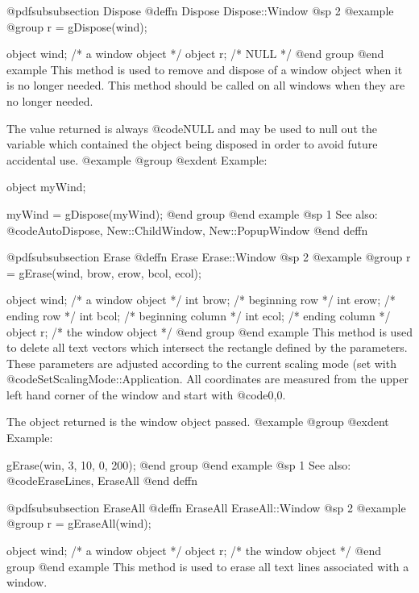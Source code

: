 @pdfsubsubsection {Dispose}
@deffn {Dispose} Dispose::Window
@sp 2
@example
@group
r = gDispose(wind);

object  wind;   /*  a window object    */
object  r;      /*  NULL               */
@end group
@end example
This method is used to remove and dispose of a window object when it
is no longer needed.  This method should be called on all windows
when they are no longer needed.

The value returned is always @code{NULL} and may be used to null out
the variable which contained the object being disposed in order to
avoid future accidental use.
@example
@group
@exdent Example:

object  myWind;

myWind = gDispose(myWind);
@end group
@end example
@sp 1
See also:  @code{AutoDispose, New::ChildWindow, New::PopupWindow}
@end deffn










@pdfsubsubsection {Erase}
@deffn {Erase} Erase::Window
@sp 2
@example
@group
r = gErase(wind, brow, erow, bcol, ecol);

object  wind;   /*  a window object     */
int     brow;   /*  beginning row       */
int     erow;   /*  ending row          */
int     bcol;   /*  beginning column    */
int     ecol;   /*  ending column       */
object  r;      /*  the window object   */
@end group
@end example
This method is used to delete all text vectors which intersect the
rectangle defined by the parameters.  These parameters are adjusted
according to the current scaling mode (set with
@code{SetScalingMode::Application}.  All coordinates are measured from
the upper left hand corner of the window and start with @code{0,0}.

The object returned is the window object passed.
@example
@group
@exdent Example:

gErase(win, 3, 10, 0, 200);
@end group
@end example
@sp 1
See also:  @code{EraseLines, EraseAll}
@end deffn










@pdfsubsubsection {EraseAll}
@deffn {EraseAll} EraseAll::Window
@sp 2
@example
@group
r = gEraseAll(wind);

object  wind;   /*  a window object     */
object  r;      /*  the window object   */
@end group
@end example
This method is used to erase all text lines associated with a window.

